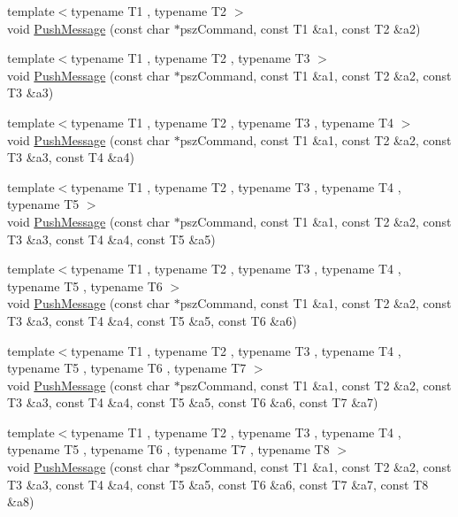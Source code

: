 \begin{DoxyCompactItemize}
{\footnotesize template$<$typename T1 , typename T2 $>$ }\\void \mbox{\hyperlink{class_c_node_a67b985781651b8806d7f9976f6fb85a9}{Push\+Message}} (const char $\ast$psz\+Command, const T1 \&a1, const T2 \&a2)
\item 
{\footnotesize template$<$typename T1 , typename T2 , typename T3 $>$ }\\void \mbox{\hyperlink{class_c_node_a79355956a00c38d855b986a34e7ba444}{Push\+Message}} (const char $\ast$psz\+Command, const T1 \&a1, const T2 \&a2, const T3 \&a3)
\item 
{\footnotesize template$<$typename T1 , typename T2 , typename T3 , typename T4 $>$ }\\void \mbox{\hyperlink{class_c_node_a2958ee10e2c96ef647787bce80196079}{Push\+Message}} (const char $\ast$psz\+Command, const T1 \&a1, const T2 \&a2, const T3 \&a3, const T4 \&a4)
\item 
{\footnotesize template$<$typename T1 , typename T2 , typename T3 , typename T4 , typename T5 $>$ }\\void \mbox{\hyperlink{class_c_node_a1f58deeed29baf57c49dae177f8be826}{Push\+Message}} (const char $\ast$psz\+Command, const T1 \&a1, const T2 \&a2, const T3 \&a3, const T4 \&a4, const T5 \&a5)
\item 
{\footnotesize template$<$typename T1 , typename T2 , typename T3 , typename T4 , typename T5 , typename T6 $>$ }\\void \mbox{\hyperlink{class_c_node_a4addbff355c502fb2f8c10451e76373d}{Push\+Message}} (const char $\ast$psz\+Command, const T1 \&a1, const T2 \&a2, const T3 \&a3, const T4 \&a4, const T5 \&a5, const T6 \&a6)
\item 
{\footnotesize template$<$typename T1 , typename T2 , typename T3 , typename T4 , typename T5 , typename T6 , typename T7 $>$ }\\void \mbox{\hyperlink{class_c_node_ab3611cdb08d5f25a4da05fe140e48625}{Push\+Message}} (const char $\ast$psz\+Command, const T1 \&a1, const T2 \&a2, const T3 \&a3, const T4 \&a4, const T5 \&a5, const T6 \&a6, const T7 \&a7)
\item 
{\footnotesize template$<$typename T1 , typename T2 , typename T3 , typename T4 , typename T5 , typename T6 , typename T7 , typename T8 $>$ }\\void \mbox{\hyperlink{class_c_node_af91d09012aa7e879be4b488b0bba903d}{Push\+Message}} (const char $\ast$psz\+Command, const T1 \&a1, const T2 \&a2, const T3 \&a3, const T4 \&a4, const T5 \&a5, const T6 \&a6, const T7 \&a7, const T8 \&a8)

\end{DoxyCompactItemize}
